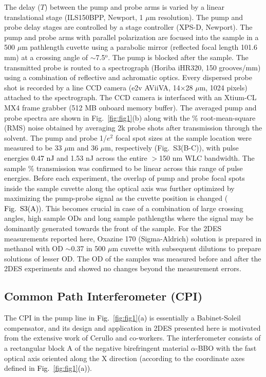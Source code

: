 \documentclass[%
aip,
amsmath,amssymb,
preprint,%
]{revtex4-2}
\newcommand*{\vt}[1]{\textcolor{black}{ #1}}
\newcommand*{\si}[1]{\textcolor{black}{ #1}}
\begin{document}
The delay ($T$) between the pump and probe arms is varied by a linear translational stage (ILS150BPP, Newport, 1 $\mu$m resolution). The pump and probe delay stages are controlled by a stage controller (XPS-D, Newport). The pump and probe arms with parallel polarization are focused into the sample in a 500 $\mu$m pathlength cuvette using a parabolic mirror (reflected focal length 101.6 mm) at a crossing angle of $\sim$7.5$^\text{o}$. The pump is blocked after the sample. The transmitted probe is routed to a spectrograph (Horiba iHR320, 150 grooves/mm) using a combination of reflective and achromatic optics. Every dispersed probe shot is recorded by a line CCD camera (e2v AViiVA, 14×28 $\mu$m, 1024 pixels) attached to the spectrograph. The CCD camera is interfaced with an Xtium-CL MX4 frame grabber (512 MB onboard memory buffer). The averaged pump and probe spectra are shown in {Fig.~\ref{fig:fig1}(b)} along with the \% root-mean-square (RMS) noise obtained by averaging 2k probe shots after transmission through the solvent. The pump and probe 1/$e^2$ focal spot sizes at the sample location were measured to be 33 $\mu$m and 36 $\mu$m, respectively (Fig.~S3(B-C)), with pulse energies \vt{0.47 nJ} and 1.53 nJ across the entire $>$150 nm WLC bandwidth. The sample \% transmission was confirmed to be linear across this range of pulse energies. Before each experiment, the overlap of pump and probe focal spots inside the sample cuvette along the optical axis was further optimized by maximizing the pump-probe signal as the cuvette position is changed (\si{Fig.~S3(A)}). This becomes crucial\cite{Cho2013} in case of a combination of large crossing angles, high sample ODs and long sample pathlengths where the signal may be dominantly generated towards the front of the sample. For the 2DES measurements reported here, Oxazine 170 (Sigma-Aldrich) solution is prepared in methanol with OD $\sim$0.37 in 500 $\mu$m cuvette with subsequent dilutions to prepare solutions of lesser OD. The OD of the samples was measured before and after the 2DES experiments and showed no changes beyond the measurement errors.\\

\subsection{Common Path Interferometer (CPI)}\label{cpi}

The CPI in the pump line in \si{Fig.~\ref{fig:fig1}(a)} is essentially a Babinet-Soleil compensator, and its design and application in 2DES presented here is motivated\cite{Cerullo2014} from the extensive work of Cerullo and co-workers. The interferometer consists of a rectangular block A of the negative birefringent material $\alpha$-BBO with the fast optical axis oriented along the X direction (according to the coordinate axes defined in \si{Fig.~\ref{fig:fig1}(a))}. 
\end{document}
